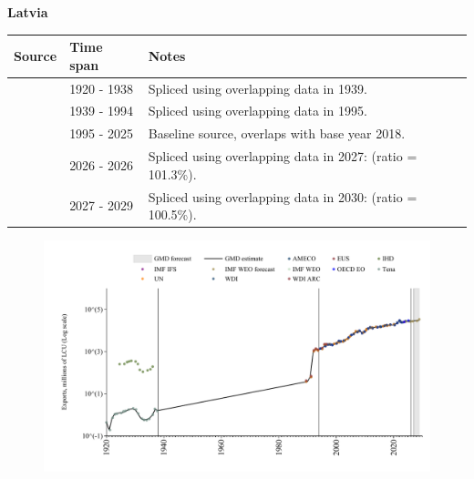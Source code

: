\documentclass[12pt,a4paper,landscape]{article}
\begin{document}
\begin{adjustbox}{max totalsize={\paperwidth}{\paperheight},center}
\begin{minipage}[t][\textheight][t]{\textwidth}
\vspace*{0.5cm}
{}
\begin{center}
{\Large\bfseries Latvia}
\end{center}
\vspace{0.5cm}
\begin{table}[H]
\centering
\small
\begin{tabular}{|l|l|l|}
\hline
\textbf{Source} & \textbf{Time span} & \textbf{Notes} \\
\hline
\rowcolor{white}\cite{Tena}& 1920 - 1938 &Spliced using overlapping data in 1939.\\
\rowcolor{lightgray}\cite{AMECO}& 1939 - 1994 &Spliced using overlapping data in 1995.\\
\rowcolor{white}\cite{OECD_EO}& 1995 - 2025 &Baseline source, overlaps with base year 2018.\\
\rowcolor{lightgray}\cite{AMECO}& 2026 - 2026 &Spliced using overlapping data in 2027: (ratio = 101.3\%).\\
\rowcolor{white}\cite{IMF_WEO_forecast}& 2027 - 2029 &Spliced using overlapping data in 2030: (ratio = 100.5\%).\\
\hline
\end{tabular}
\end{table}
\begin{figure}[H]
\centering
\includegraphics[width=\textwidth,height=0.6\textheight,keepaspectratio]{graphs/LVA_exports.pdf}
\end{figure}
\end{minipage}
\end{adjustbox}
\end{document}
